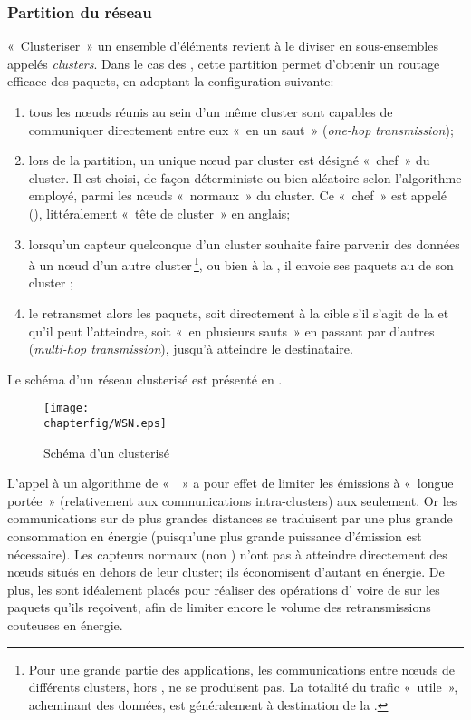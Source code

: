         \subsubsection{Partition du réseau}
«~Clusteriser~» un ensemble d'éléments revient à le diviser en sous-ensembles appelés \textit{clusters}.
Dans le cas des \rcsfs, cette partition permet d'obtenir un routage efficace des paquets, en adoptant la configuration suivante:
\begin{enumerate}
    \item tous les nœuds réunis au sein d'un même cluster sont capables de communiquer directement entre eux « en un saut » (\textit{one-hop transmission});
    \item lors de la partition, un unique nœud par cluster est désigné «~chef~» du cluster.
        Il est choisi, de façon déterministe ou bien aléatoire selon l'algorithme employé, parmi les nœuds «~normaux~» du cluster.
        Ce «~chef~» est appelé \textit{\ch} (\CH), littéralement « tête de cluster » en anglais;
    \item lorsqu'un capteur quelconque d'un cluster souhaite faire parvenir des données à un nœud d'un autre cluster\,\footnote{Pour une grande partie des applications, les communications entre nœuds de différents clusters, hors \chs, ne se produisent pas. La totalité du trafic «~utile~», acheminant des données, est généralement à destination de la \sdb.}, ou bien à la \sdb, il envoie ses paquets au \ch de son cluster ;
    \item le \ch retransmet alors les paquets, soit directement à la cible s'il s'agit de la \sdb et qu'il peut l'atteindre, soit « en plusieurs sauts » en passant par d'autres \chs (\textit{multi-hop transmission}), jusqu'à atteindre le destinataire.
\end{enumerate}
Le schéma d'un réseau clusterisé est présenté en .
\begin{figure}
    \centering
    \texttt{[image: \\chapterfig/WSN.eps]}
    \caption{Schéma d'un \rc clusterisé}\label{st:fig:wsn}
\end{figure}
L'appel à un algorithme de «  » a pour effet de limiter les émissions à «~longue portée~» (relativement aux communications intra-clusters) aux \chs seulement.
Or les communications sur de plus grandes distances se traduisent par une plus grande consommation en énergie (puisqu'une plus grande puissance d'émission est nécessaire).
Les capteurs normaux (non \chs) n'ont pas à atteindre directement des nœuds situés en dehors de leur cluster; ils économisent d'autant en énergie.
De plus, les \chs sont idéalement placés pour réaliser des opérations d' voire de  sur les paquets qu'ils reçoivent, afin de limiter encore le volume des retransmissions couteuses en énergie.

